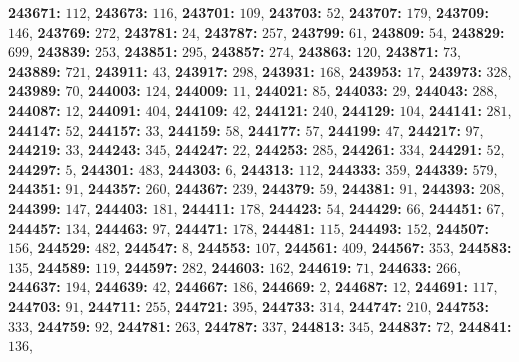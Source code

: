 \textsf{\bfseries 243671:} $112$, \textsf{\bfseries 243673:} $116$, \textsf{\bfseries 243701:} $109$, \textsf{\bfseries 243703:} $52$, \textsf{\bfseries 243707:} $179$, \textsf{\bfseries 243709:} $146$, \textsf{\bfseries 243769:} $272$, \textsf{\bfseries 243781:} $24$, \textsf{\bfseries 243787:} $257$, \textsf{\bfseries 243799:} $61$, \textsf{\bfseries 243809:} $54$, \textsf{\bfseries 243829:} $699$, \textsf{\bfseries 243839:} $253$, \textsf{\bfseries 243851:} $295$, \textsf{\bfseries 243857:} $274$, \textsf{\bfseries 243863:} $120$, \textsf{\bfseries 243871:} $73$, \textsf{\bfseries 243889:} $721$, \textsf{\bfseries 243911:} $43$, \textsf{\bfseries 243917:} $298$, \textsf{\bfseries 243931:} $168$, \textsf{\bfseries 243953:} $17$, \textsf{\bfseries 243973:} $328$, \textsf{\bfseries 243989:} $70$, \textsf{\bfseries 244003:} $124$, \textsf{\bfseries 244009:} $11$, \textsf{\bfseries 244021:} $85$, \textsf{\bfseries 244033:} $29$, \textsf{\bfseries 244043:} $288$, \textsf{\bfseries 244087:} $12$, \textsf{\bfseries 244091:} $404$, \textsf{\bfseries 244109:} $42$, \textsf{\bfseries 244121:} $240$, \textsf{\bfseries 244129:} $104$, \textsf{\bfseries 244141:} $281$, \textsf{\bfseries 244147:} $52$, \textsf{\bfseries 244157:} $33$, \textsf{\bfseries 244159:} $58$, \textsf{\bfseries 244177:} $57$, \textsf{\bfseries 244199:} $47$, \textsf{\bfseries 244217:} $97$, \textsf{\bfseries 244219:} $33$, \textsf{\bfseries 244243:} $345$, \textsf{\bfseries 244247:} $22$, \textsf{\bfseries 244253:} $285$, \textsf{\bfseries 244261:} $334$, \textsf{\bfseries 244291:} $52$, \textsf{\bfseries 244297:} $5$, \textsf{\bfseries 244301:} $483$, \textsf{\bfseries 244303:} $6$, \textsf{\bfseries 244313:} $112$, \textsf{\bfseries 244333:} $359$, \textsf{\bfseries 244339:} $579$, \textsf{\bfseries 244351:} $91$, \textsf{\bfseries 244357:} $260$, \textsf{\bfseries 244367:} $239$, \textsf{\bfseries 244379:} $59$, \textsf{\bfseries 244381:} $91$, \textsf{\bfseries 244393:} $208$, \textsf{\bfseries 244399:} $147$, \textsf{\bfseries 244403:} $181$, \textsf{\bfseries 244411:} $178$, \textsf{\bfseries 244423:} $54$, \textsf{\bfseries 244429:} $66$, \textsf{\bfseries 244451:} $67$, \textsf{\bfseries 244457:} $134$, \textsf{\bfseries 244463:} $97$, \textsf{\bfseries 244471:} $178$, \textsf{\bfseries 244481:} $115$, \textsf{\bfseries 244493:} $152$, \textsf{\bfseries 244507:} $156$, \textsf{\bfseries 244529:} $482$, \textsf{\bfseries 244547:} $8$, \textsf{\bfseries 244553:} $107$, \textsf{\bfseries 244561:} $409$, \textsf{\bfseries 244567:} $353$, \textsf{\bfseries 244583:} $135$, \textsf{\bfseries 244589:} $119$, \textsf{\bfseries 244597:} $282$, \textsf{\bfseries 244603:} $162$, \textsf{\bfseries 244619:} $71$, \textsf{\bfseries 244633:} $266$, \textsf{\bfseries 244637:} $194$, \textsf{\bfseries 244639:} $42$, \textsf{\bfseries 244667:} $186$, \textsf{\bfseries 244669:} $2$, \textsf{\bfseries 244687:} $12$, \textsf{\bfseries 244691:} $117$, \textsf{\bfseries 244703:} $91$, \textsf{\bfseries 244711:} $255$, \textsf{\bfseries 244721:} $395$, \textsf{\bfseries 244733:} $314$, \textsf{\bfseries 244747:} $210$, \textsf{\bfseries 244753:} $333$, \textsf{\bfseries 244759:} $92$, \textsf{\bfseries 244781:} $263$, \textsf{\bfseries 244787:} $337$, \textsf{\bfseries 244813:} $345$, \textsf{\bfseries 244837:} $72$, \textsf{\bfseries 244841:} $136$, 
